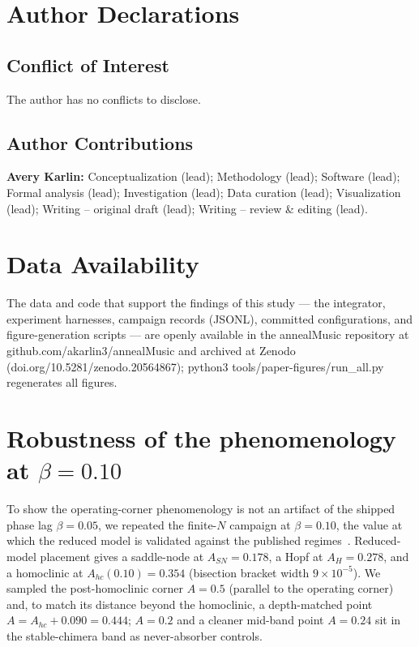 \documentclass[11pt]{article}
\begin{document}
\section*{Author Declarations}

\subsection*{Conflict of Interest}
The author has no conflicts to disclose.

\subsection*{Author Contributions}
\textbf{Avery Karlin:} Conceptualization (lead); Methodology (lead); Software
(lead); Formal analysis (lead); Investigation (lead); Data curation (lead);
Visualization (lead); Writing -- original draft (lead); Writing -- review \&
editing (lead).

\section*{Data Availability}
The data and code that support the findings of this study --- the integrator,
experiment harnesses, campaign records (JSONL), committed configurations, and
figure-generation scripts --- are openly available in the annealMusic repository at
github.com/akarlin3/annealMusic and archived at Zenodo
(doi.org/10.5281/zenodo.20564867); python3 tools/paper-figures/run\_all.py
regenerates all figures.

\appendix

\section{Robustness of the phenomenology at $\beta = 0.10$}\label{app:beta}

To show the operating-corner phenomenology is not an artifact of the shipped phase
lag $\beta = 0.05$, we repeated the finite-$N$ campaign at $\beta = 0.10$, the value
at which the reduced model is validated against the published
regimes~\cite{abrams2008}. Reduced-model placement gives a saddle-node at
$A_{SN} = 0.178$, a Hopf at $A_H = 0.278$, and a homoclinic at
$A_{hc}(0.10) = 0.354$ (bisection bracket width $9\times10^{-5}$). We sampled the
post-homoclinic corner $A = 0.5$ (parallel to the operating corner) and, to match its
distance beyond the homoclinic, a depth-matched point
$A = A_{hc} + 0.090 = 0.444$; $A = 0.2$ and a cleaner mid-band point $A = 0.24$ sit
in the stable-chimera band as never-absorber controls.
\end{document}
